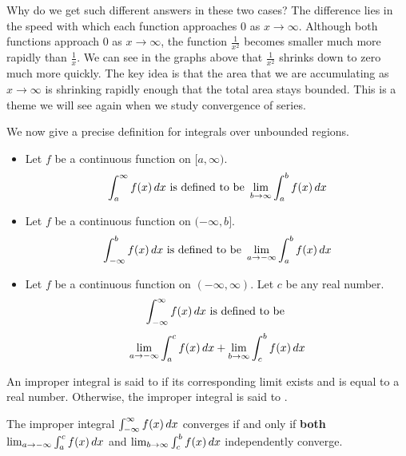 \documentclass{ximera}
\begin{document}
Why do we get such different answers in these two cases?  The difference lies in the speed with which each function approaches $0$ as $x \to \infty$. Although both functions approach $0$ as $x \to \infty$, the function $\frac{1}{x^2}$ becomes smaller much more rapidly than $\frac{1}{x}$.
We can see in the graphs above that $\frac{1}{x^2}$ shrinks down to zero much more quickly. The key idea is that the area that we are accumulating as $x\to \infty$ is shrinking rapidly enough that the total area stays bounded. This is a theme we will see again when we study convergence of series.

We now give a precise definition for integrals over unbounded regions.

\begin{definition}\hfil
\begin{itemize}
\item Let $f$ be a continuous function on $[a,\infty)$.
  \[
  \int_a^\infty f(x) \mathop{}\!d x \text{ is defined to be } \lim_{b\to\infty}\int_a^b f(x) \mathop{}\!d x
  \]
\item Let $f$ be a continuous function on $(-\infty,b]$.
  \[
  \int_{-\infty}^b f(x) \mathop{}\!d x \text{ is defined to be } \lim_{a\to-\infty}\int_a^b f(x) \mathop{}\!d x
  \]
\item Let $f$ be a continuous function on $(-\infty,\infty)$. Let $c$
  be any real number.
  \[
  \int_{-\infty}^\infty f(x) \mathop{}\!d x \text{ is defined to be }
  \]
  \[
  \lim_{a\to-\infty}\int_a^c f(x) \mathop{}\!d x + \lim_{b\to\infty}\int_c^b
  f(x) \mathop{}\!d x
  \]
\end{itemize}
An improper integral is said to  if its corresponding
limit exists and is equal to a real number. Otherwise, the improper
integral is said to .
\end{definition}

\begin{warning}
  The improper integral $  \int_{-\infty}^\infty f(x) \mathop{}\!d x$ converges if and only if \textbf{both}  $ \lim_{a\to-\infty}\int_a^c f(x) \mathop{}\!d x$
and $  \lim_{b\to\infty}\int_c^b f(x) \mathop{}\!d x$
independently converge.
\end{warning}
\end{document}
